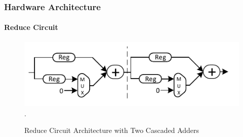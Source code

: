 \documentclass{beamer}
\begin{document}
\begin{frame}
\frametitle{Hardware Architecture}
\framesubtitle{Reduce Circuit}
\begin{figure}[t]
\centering
\captionsetup{justification=centering}
\includegraphics[scale=0.9]{../ASAP_17/figure/Reduce.pdf}
\DeclareGraphicsExtensions.
\caption{Reduce Circuit Architecture with Two Cascaded Adders\label{fig_red}}
\end{figure}
\end{frame}
\end{document}
